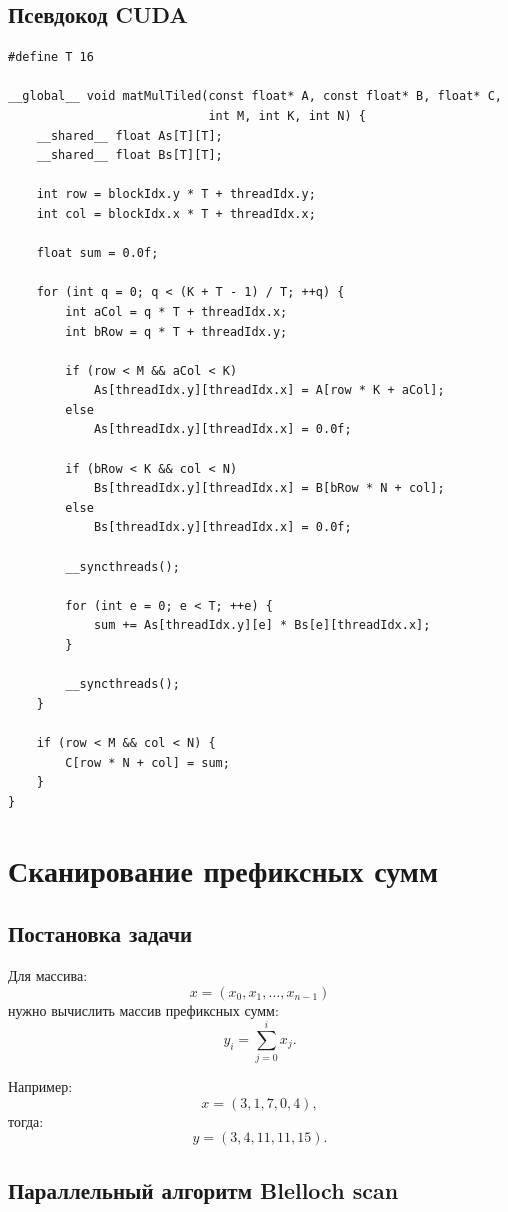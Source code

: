 \documentclass[12pt,a4paper]{article}
\begin{document}
\subsection{Псевдокод CUDA}

\begin{lstlisting}[style=cuda]
#define T 16

__global__ void matMulTiled(const float* A, const float* B, float* C,
                            int M, int K, int N) {
    __shared__ float As[T][T];
    __shared__ float Bs[T][T];

    int row = blockIdx.y * T + threadIdx.y;
    int col = blockIdx.x * T + threadIdx.x;

    float sum = 0.0f;

    for (int q = 0; q < (K + T - 1) / T; ++q) {
        int aCol = q * T + threadIdx.x;
        int bRow = q * T + threadIdx.y;

        if (row < M && aCol < K)
            As[threadIdx.y][threadIdx.x] = A[row * K + aCol];
        else
            As[threadIdx.y][threadIdx.x] = 0.0f;

        if (bRow < K && col < N)
            Bs[threadIdx.y][threadIdx.x] = B[bRow * N + col];
        else
            Bs[threadIdx.y][threadIdx.x] = 0.0f;

        __syncthreads();

        for (int e = 0; e < T; ++e) {
            sum += As[threadIdx.y][e] * Bs[e][threadIdx.x];
        }

        __syncthreads();
    }

    if (row < M && col < N) {
        C[row * N + col] = sum;
    }
}
\end{lstlisting}

\section{Сканирование префиксных сумм}

\subsection{Постановка задачи}

Для массива:
\[
    x = (x_0,x_1,\dots,x_{n-1})
\]
нужно вычислить массив префиксных сумм:
\[
    y_i = \sum_{j=0}^{i} x_j.
\]

Например:
\[
    x = (3,1,7,0,4),
\]
тогда:
\[
    y = (3,4,11,11,15).
\]

\subsection{Параллельный алгоритм Blelloch scan}
\end{document}
